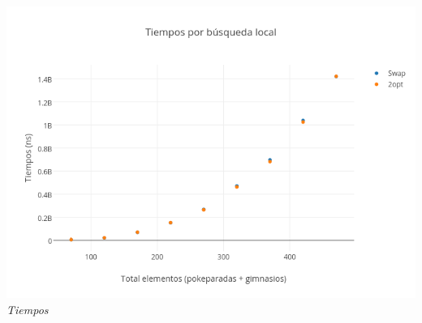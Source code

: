 \begin{figure}[h] 
 \centering
       \label{fig:gruposDist2}
    \label{fig:gruposMejora2}
    \end{figure}
 
   \vspace*{0.3cm} \vspace*{0.3cm}
  \begin{center}
	\includegraphics[scale=0.50]{./EJ3/tiemposLocales470cuad.png}
	\label{fig:gruposTiempos2}	
	\\{\textit{Tiempos}}
  \end{center}
  \vspace*{0.3cm} 
 
